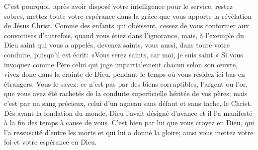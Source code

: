 C’est pourquoi, après avoir disposé votre intelligence pour le service,
	restez sobres, mettez toute votre espérance dans la grâce
		que vous apporte la révélation de Jésus Christ.
Comme des enfants qui obéissent,
	cessez de vous conformer aux convoitises d’autrefois,
	quand vous étiez dans l’ignorance,
	mais, à l’exemple du Dieu saint qui vous a appelés,
	devenez saints, vous aussi, dans toute votre conduite,
	puisqu’il est écrit: «Vous serez saints, car moi, je suis saint.»
Si vous invoquez comme Père
		celui qui juge impartialement chacun selon son œuvre,
	vivez donc dans la crainte de Dieu,
	pendant le temps où vous résidez ici-bas en étrangers.
Vous le savez: ce n’est pas par des biens corruptibles, l’argent ou l’or,
	que vous avez été rachetés de la conduite superficielle
		héritée de vos pères;
	mais c’est par un sang précieux,
	celui d’un agneau sans défaut et sans tache, le Christ.
Dès avant la fondation du monde, Dieu l’avait désigné d’avance
	et il l’a manifesté à la fin des temps à cause de vous.
C’est bien par lui que vous croyez en Dieu,
	qui l’a ressuscité d’entre les morts et qui lui a donné la gloire;
	ainsi vous mettez votre foi et votre espérance en Dieu.
